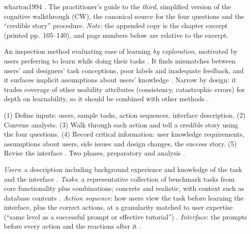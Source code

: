 \begin{papercard}{wharton1994}
 . The practitioner's guide to the \emph{third}, simplified version of the cognitive walkthrough (CW), the canonical source for the four questions and the ``credible story'' procedure. \emph{Note:} the appended copy is the chapter excerpt (printed pp.\ 105--140), and page numbers below are relative to the excerpt.

 An inspection method evaluating ease of learning \emph{by exploration}, motivated by users preferring to learn while doing their tasks . It finds mismatches between users' and designers' task conceptions, poor labels and inadequate feedback, and it surfaces implicit assumptions about users' knowledge . Narrow by design: it trades coverage of other usability attributes (consistency, catastrophic errors) for depth on learnability, so it should be combined with other methods .

 (1) Define inputs: users, sample tasks, action sequences, interface description. (2) Convene analysts. (3) Walk through each action and tell a credible story using the four questions. (4) Record critical information: user knowledge requirements, assumptions about users, side issues and design changes, the success story. (5) Revise the interface . Two phases, preparatory and analysis .

 \emph{Users}: a description including background experience and knowledge of the task and the interface . \emph{Tasks}: a representative collection of benchmark tasks from core functionality plus combinations; concrete and realistic, with context such as database contents . \emph{Action sequence}: how users view the task before learning the interface, plus the correct actions, at a granularity matched to user expertise (``same level as a successful prompt or effective tutorial'') . \emph{Interface}: the prompts before every action and the reactions after it .


\end{papercard}
